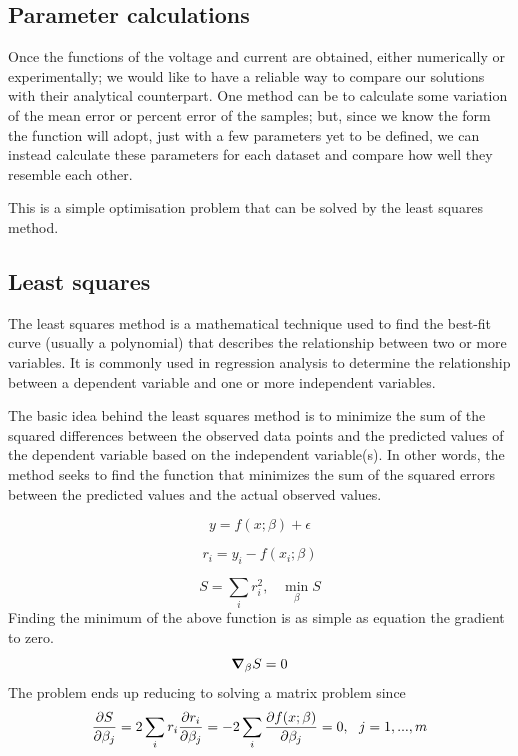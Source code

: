 \documentclass[12pt,twoside]{extarticle}
\begin{document}
\subsection{Parameter calculations}
Once the functions of the voltage and current are obtained, either numerically or experimentally; we would like to have a reliable way to compare our solutions with their analytical counterpart. One method can be to calculate some variation of the mean error or percent error of the samples; but, since we know the form the function will adopt, just with a few parameters yet to be defined, we can instead calculate these parameters for each dataset and compare how well they resemble each other.

This is a simple optimisation problem that can be solved by the least squares method.
\subsection{Least squares}
The least squares method is a mathematical technique used to find the best-fit curve (usually a polynomial) that describes the relationship between two or more variables. It is commonly used in regression analysis to determine the relationship between a dependent variable and one or more independent variables.

The basic idea behind the least squares method is to minimize the sum of the squared differences between the observed data points and the predicted values of the dependent variable based on the independent variable(s). In other words, the method seeks to find the function that minimizes the sum of the squared errors between the predicted values and the actual observed values.

\begin{equation}
    y = f(x;\beta) + \epsilon
\end{equation}

\begin{equation}
    r_i = y_i - f(x_i;\beta)
\end{equation}

\begin{equation}
    S= \sum_i r^2_i,  \,\,\,\,\, \min_\beta S
\end{equation}
Finding the minimum of the above function is as simple as equation the gradient to zero.
\begin{equation}
    \grad_\beta S=0
\end{equation}
The problem ends up reducing to solving a matrix problem since
\begin{equation}\label{eq:min}
    \pdv{S}{\beta_j} = 2\sum_i r_i \pdv{r_i}{\beta_j}= -2\sum_i \pdv{f(x;\beta)}{\beta_j}=0,\,\,\,\, j=1,...,m 
\end{equation}
\end{document}
